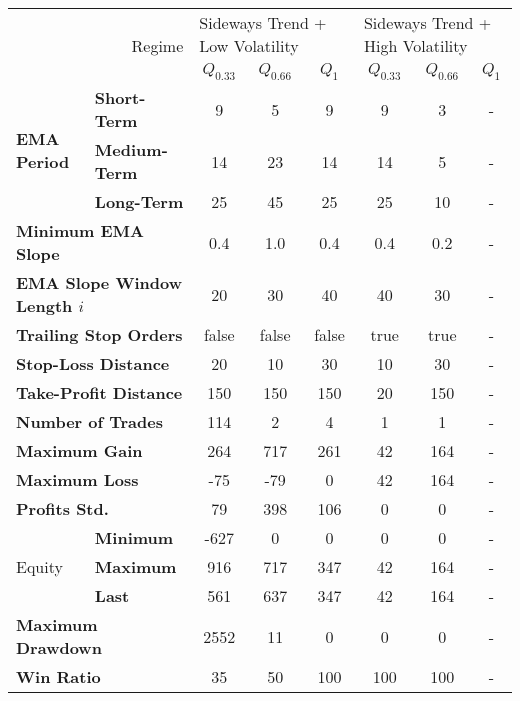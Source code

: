 \centering
\begin{tabular}{ll|cccccc}
    \toprule
    \multicolumn{2}{r|}{\multirow{2}{*}{Regime}} & \multicolumn{3}{l}{Sideways Trend + Low Volatility} & \multicolumn{3}{l}{Sideways Trend + High Volatility}  \\
    \multicolumn{2}{r|}{} & $Q_{0.33}$ & $Q_{0.66}$ & $Q_{1}$ & $Q_{0.33}$ & $Q_{0.66}$ & $Q_{1}$ \\
    \midrule
    \multirow{3}{*}{\textbf{EMA Period}} & \textbf{Short-Term}  & 9    & 5   & 9   & 9  & 3   & - \\
    & \textbf{Medium-Term} & 14   & 23  & 14  & 14 & 5   & - \\
    & \textbf{Long-Term}   & 25   & 45  & 25  & 25 & 10  & - \\
    \multicolumn{2}{l|}{\textbf{Minimum EMA Slope}} & 0.4 & 1.0 & 0.4 & 0.4 & 0.2 & - \\
    \multicolumn{2}{l|}{\textbf{EMA Slope Window Length $i$}} & 20 & 30 & 40 & 40 & 30 & - \\
    \multicolumn{2}{l|}{\textbf{Trailing Stop Orders}} & false & false & false & true & true & - \\
    \multicolumn{2}{l|}{\textbf{Stop-Loss Distance}} & 20 & 10 & 30 & 10 & 30 & - \\
    \multicolumn{2}{l|}{\textbf{Take-Profit Distance}} & 150 & 150 & 150 & 20 & 150 & - \\
    \midrule
    \multicolumn{2}{l|}{\textbf{Number of Trades}} & 114 & 2 & 4 & 1 & 1 & - \\
    \multicolumn{2}{l|}{\textbf{Maximum Gain}} & 264 & 717 & 261 & 42 & 164 & - \\
    \multicolumn{2}{l|}{\textbf{Maximum Loss}} & -75 & -79 & 0 & 42 & 164 & - \\
    \multicolumn{2}{l|}{\textbf{Profits Std.}} & 79 & 398 & 106 & 0 & 0 & - \\
    \multirow{3}{*}{Equity}              & \textbf{Minimum}     & -627 & 0   & 0   & 0  & 0   & - \\
    & \textbf{Maximum}     & 916  & 717 & 347 & 42 & 164 & - \\
    & \textbf{Last}        & 561  & 637 & 347 & 42 & 164 & - \\
    \multicolumn{2}{l|}{\textbf{Maximum Drawdown}} & 2552 & 11 & 0 & 0 & 0 & - \\
    \multicolumn{2}{l|}{\textbf{Win Ratio}} & 35 & 50 & 100 & 100 & 100 & - \\
    \bottomrule
\end{tabular}